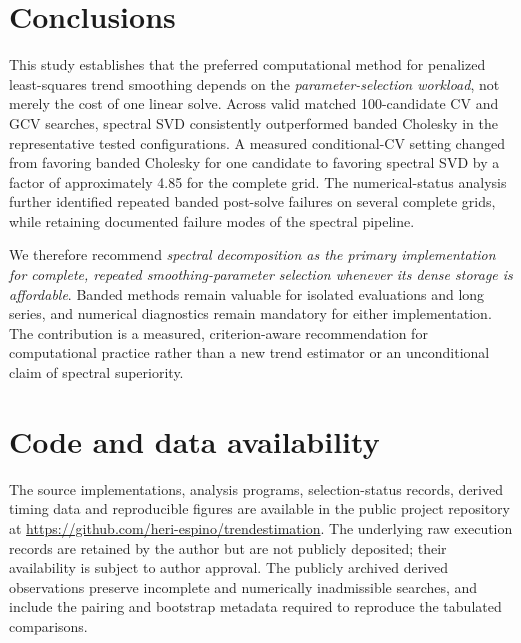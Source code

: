 \section{Conclusions}
This study establishes that the preferred computational method for penalized least-squares trend smoothing depends on the \emph{parameter-selection workload}, not merely the cost of one linear solve. Across valid matched 100-candidate CV and GCV searches, spectral SVD consistently outperformed banded Cholesky in the representative tested configurations. A measured conditional-CV setting changed from favoring banded Cholesky for one candidate to favoring spectral SVD by a factor of approximately 4.85 for the complete grid. The numerical-status analysis further identified repeated banded post-solve failures on several complete grids, while retaining documented failure modes of the spectral pipeline.

We therefore recommend \emph{spectral decomposition as the primary implementation for complete, repeated smoothing-parameter selection whenever its dense storage is affordable}. Banded methods remain valuable for isolated evaluations and long series, and numerical diagnostics remain mandatory for either implementation. The contribution is a measured, criterion-aware recommendation for computational practice rather than a new trend estimator or an unconditional claim of spectral superiority.

\section{Code and data availability}
The source implementations, analysis programs, selection-status records, derived timing data and reproducible figures are available in the public project repository at \url{https://github.com/heri-espino/trendestimation}. The underlying raw execution records are retained by the author but are not publicly deposited; their availability is subject to author approval. The publicly archived derived observations preserve incomplete and numerically inadmissible searches, and include the pairing and bootstrap metadata required to reproduce the tabulated comparisons.
